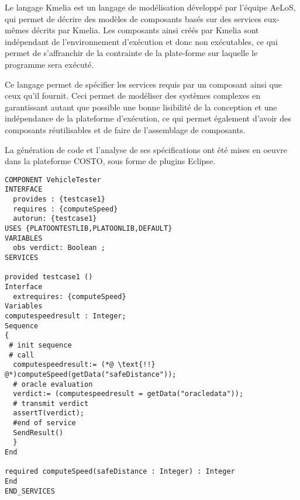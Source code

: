     Le langage Kmelia\cite{Kmelia} est un langage de modélisation développé par l'équipe AeLoS, qui permet de décrire des modèles de composants basés sur des services eux-mêmes décrits par Kmelia. Les composants ainsi créés par Kmelia sont indépendant de l'environnement d'exécution et donc non exécutables, ce qui permet de s'affranchir de la contrainte de la plate-forme sur laquelle le programme sera exécuté. 

    Ce langage permet de spécifier les services requis par un composant ainsi que ceux qu'il fournit. Ceci permet de modéliser des systèmes complexes en garantissant autant que possible une bonne lisibilité de la conception et une  indépendance de la plateforme d'exécution, ce qui permet également d'avoir des composants réutilisables et de faire de l'assemblage de composants.

    La génération de code et l'analyse de ses spécifications ont été mises en oeuvre dans la plateforme COSTO, sous forme de plugins Eclipse.

\begin{lstlisting}[frame=single, caption={Exemple de fichier Kmelia décrivant un composant},label=fig:KmeliaVehicleTester]
COMPONENT VehicleTester
INTERFACE  
  provides : {testcase1}
  requires : {computeSpeed} 
  autorun: {testcase1}
USES {PLATOONTESTLIB,PLATOONLIB,DEFAULT} 
VARIABLES    
  obs verdict: Boolean ;
SERVICES

provided testcase1 ()
Interface
  extrequires: {computeSpeed}   
Variables
computespeedresult : Integer;
Sequence
{   
 # init sequence
 # call
  computespeedresult:= (*@ \text{!!} @*)computeSpeed(getData("safeDistance"));
  # oracle evaluation
  verdict:= (computespeedresult = getData("oracledata"));
  # transmit verdict
  assertT(verdict);
  #end of service
  SendResult()
  }
End

required computeSpeed(safeDistance : Integer) : Integer
End
END_SERVICES

\end{lstlisting}

